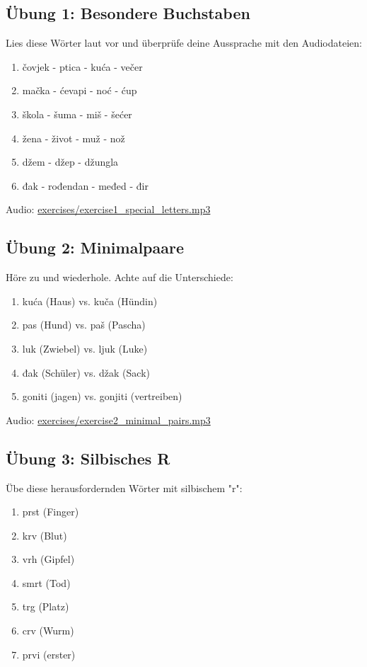 \subsection{Übung 1: Besondere Buchstaben}

Lies diese Wörter laut vor und überprüfe deine Aussprache mit den Audiodateien:

\begin{enumerate}
    \item čovjek - ptica - kuća - večer
    \item mačka - ćevapi - noć - ćup
    \item škola - šuma - miš - šećer
    \item žena - život - muž - nož
    \item džem - džep - džungla
    \item đak - rođendan - međed - đir
\end{enumerate}

Audio: \small\url{exercises/exercise1\_special\_letters.mp3}

\subsection{Übung 2: Minimalpaare}

Höre zu und wiederhole. Achte auf die Unterschiede:

\begin{enumerate}
    \item kuća (Haus) vs. kuča (Hündin)
    \item pas (Hund) vs. paš (Pascha)
    \item luk (Zwiebel) vs. ljuk (Luke)
    \item đak (Schüler) vs. džak (Sack)
    \item goniti (jagen) vs. gonjiti (vertreiben)
\end{enumerate}

Audio: \small\url{exercises/exercise2\_minimal\_pairs.mp3}

\subsection{Übung 3: Silbisches R}

Übe diese herausfordernden Wörter mit silbischem "r":

\begin{enumerate}
    \item prst (Finger)
    \item krv (Blut)
    \item vrh (Gipfel)
    \item smrt (Tod)
    \item trg (Platz)
    \item crv (Wurm)
    \item prvi (erster)
\end{enumerate}

